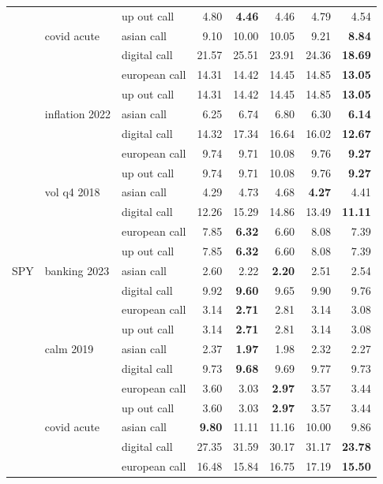 \documentclass[11pt,oneside]{report}
\begin{document}
{\begin{longtable}{@{}p{1.3cm}p{1.7cm}p{1.6cm}rrrrr@{}}
 &  & up out call & 4.80 & \textbf{4.46} & 4.46 & 4.79 & 4.54 \\
 & covid acute & asian call & 9.10 & 10.00 & 10.05 & 9.21 & \textbf{8.84} \\
 &  & digital call & 21.57 & 25.51 & 23.91 & 24.36 & \textbf{18.69} \\
 &  & european call & 14.31 & 14.42 & 14.45 & 14.85 & \textbf{13.05} \\
 &  & up out call & 14.31 & 14.42 & 14.45 & 14.85 & \textbf{13.05} \\
 & inflation 2022 & asian call & 6.25 & 6.74 & 6.80 & 6.30 & \textbf{6.14} \\
 &  & digital call & 14.32 & 17.34 & 16.64 & 16.02 & \textbf{12.67} \\
 &  & european call & 9.74 & 9.71 & 10.08 & 9.76 & \textbf{9.27} \\
 &  & up out call & 9.74 & 9.71 & 10.08 & 9.76 & \textbf{9.27} \\
 & vol q4 2018 & asian call & 4.29 & 4.73 & 4.68 & \textbf{4.27} & 4.41 \\
 &  & digital call & 12.26 & 15.29 & 14.86 & 13.49 & \textbf{11.11} \\
 &  & european call & 7.85 & \textbf{6.32} & 6.60 & 8.08 & 7.39 \\
 &  & up out call & 7.85 & \textbf{6.32} & 6.60 & 8.08 & 7.39 \\
\midrule
SPY & banking 2023 & asian call & 2.60 & 2.22 & \textbf{2.20} & 2.51 & 2.54 \\
 &  & digital call & 9.92 & \textbf{9.60} & 9.65 & 9.90 & 9.76 \\
 &  & european call & 3.14 & \textbf{2.71} & 2.81 & 3.14 & 3.08 \\
 &  & up out call & 3.14 & \textbf{2.71} & 2.81 & 3.14 & 3.08 \\
 & calm 2019 & asian call & 2.37 & \textbf{1.97} & 1.98 & 2.32 & 2.27 \\
 &  & digital call & 9.73 & \textbf{9.68} & 9.69 & 9.77 & 9.73 \\
 &  & european call & 3.60 & 3.03 & \textbf{2.97} & 3.57 & 3.44 \\
 &  & up out call & 3.60 & 3.03 & \textbf{2.97} & 3.57 & 3.44 \\
 & covid acute & asian call & \textbf{9.80} & 11.11 & 11.16 & 10.00 & 9.86 \\
 &  & digital call & 27.35 & 31.59 & 30.17 & 31.17 & \textbf{23.78} \\
 &  & european call & 16.48 & 15.84 & 16.75 & 17.19 & \textbf{15.50} \\

\end{longtable}}
\end{document}
